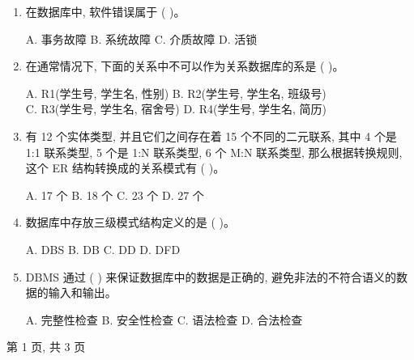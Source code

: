 \documentclass{ctexart} %
\begin{document}
\begin{enumerate}[label=\arabic*.]
    \item 在数据库中, 软件错误属于 ( )。
    \begin{flushleft}
    A. 事务故障 \hspace{2cm} B. 系统故障 \hspace{2cm} C. 介质故障 \hspace{2cm} D. 活锁
    \end{flushleft}
    \item 在通常情况下, 下面的关系中不可以作为关系数据库的系是 ( )。 %
    \begin{flushleft}
    A. R1(学生号, 学生名, 性别) \hspace{2cm} B. R2(学生号, 学生名, 班级号) \\
    C. R3(学生号, 学生名, 宿舍号) \hspace{2cm} D. R4(学生号, 学生名, 简历)
    \end{flushleft}
    \item 有 12 个实体类型, 并且它们之间存在着 15 个不同的二元联系, 其中 4 个是 1:1 联系类型, 5 个是 1:N 联系类型, 6 个 M:N 联系类型, 那么根据转换规则, 这个 ER 结构转换成的关系模式有 ( )。
    \begin{flushleft}
    A. 17 个 \hspace{2cm} B. 18 个 \hspace{2cm} C. 23 个 \hspace{2cm} D. 27 个
    \end{flushleft}
    \item 数据库中存放三级模式结构定义的是 ( )。
    \begin{flushleft}
    A. DBS \hspace{2cm} B. DB \hspace{2cm} C. DD \hspace{2cm} D. DFD
    \end{flushleft}
    \item DBMS 通过 ( ) 来保证数据库中的数据是正确的, 避免非法的不符合语义的数据的输入和输出。
    \begin{flushleft}
    A. 完整性检查 \hspace{2cm} B. 安全性检查 \hspace{2cm} C. 语法检查 \hspace{2cm} D. 合法检查
    \end{flushleft}
\end{enumerate}

\vfill
\centering
第 1 页, 共 3 页
\end{document}
